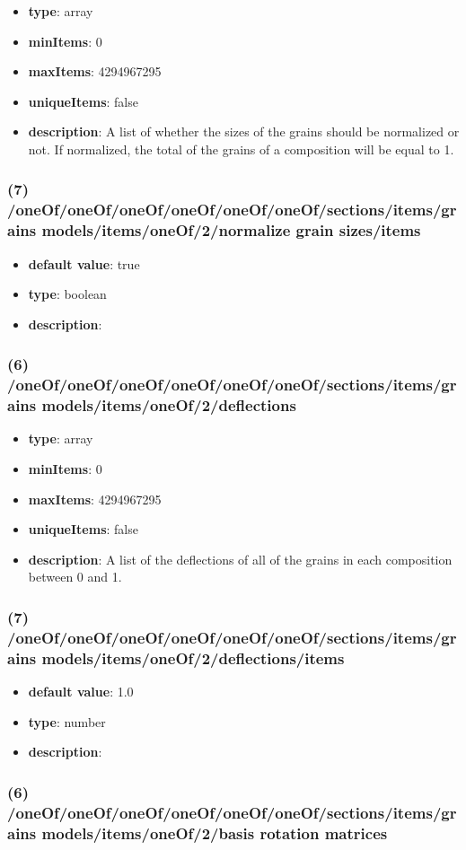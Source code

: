 \begin{itemize}[leftmargin=6em]\item {\bf type}: array
\item {\bf minItems}: 0
\item {\bf maxItems}: 4294967295
\item {\bf uniqueItems}: false
\item {\bf description}: A list of whether the sizes of the grains should be normalized or not. If normalized, the total of the grains of a composition will be equal to 1.
\end{itemize}\subsubsection{(7) /oneOf/oneOf/oneOf/oneOf/oneOf/oneOf/sections/items/grains models/items/oneOf/2/normalize grain sizes/items}
\begin{itemize}[leftmargin=7em]\item {\bf default value}: true
\item {\bf type}: boolean
\item {\bf description}: 
\end{itemize}\subsubsection{(6) /oneOf/oneOf/oneOf/oneOf/oneOf/oneOf/sections/items/grains models/items/oneOf/2/deflections}
\begin{itemize}[leftmargin=6em]\item {\bf type}: array
\item {\bf minItems}: 0
\item {\bf maxItems}: 4294967295
\item {\bf uniqueItems}: false
\item {\bf description}: A list of the deflections of all of the grains in each composition between 0 and 1.
\end{itemize}\subsubsection{(7) /oneOf/oneOf/oneOf/oneOf/oneOf/oneOf/sections/items/grains models/items/oneOf/2/deflections/items}
\begin{itemize}[leftmargin=7em]\item {\bf default value}: 1.0
\item {\bf type}: number
\item {\bf description}: 
\end{itemize}\subsubsection{(6) /oneOf/oneOf/oneOf/oneOf/oneOf/oneOf/sections/items/grains models/items/oneOf/2/basis rotation matrices}
